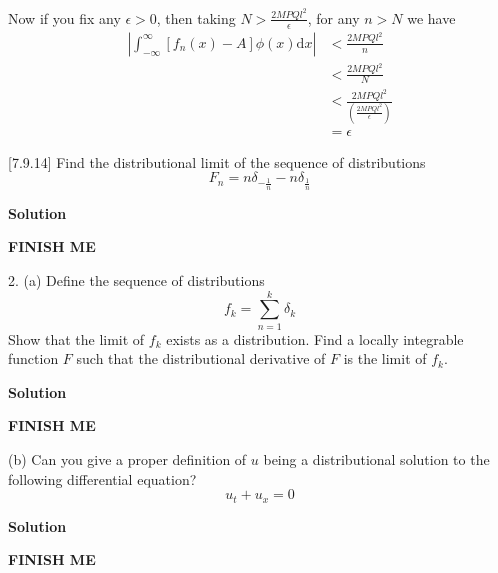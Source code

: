 \documentclass{article}
\begin{document}
%
Now if you fix any $\epsilon > 0$, then taking
$N > \frac{2 M P Q l^2}{\epsilon}$, for any $n > N$ we have
%
\begin{align*}
    \left| \int_{-\infty}^{\infty} \left[ f_n(x) - A \right] \phi(x) \mathrm{d} x \right|
        &< \frac{2 M P Q l^2}{n} \\
        &< \frac{2 M P Q l^2}{N} \\
        &< \frac{2 M P Q l^2}{\left(\frac{2 M P Q l^2}{\epsilon}\right)} \\
        &= \epsilon
\end{align*}

\vspace{5mm}

[7.9.14] Find the distributional limit of the sequence of distributions
%
\begin{equation*}
    F_n = n \delta_{- \frac{1}{n}} - n \delta_{\frac{1}{n}}
\end{equation*}

\textbf{Solution}

\textbf{FINISH ME}

\newpage

2. (a) Define the sequence of distributions
%
\begin{equation*}
    f_k = \sum_{n = 1}^k \delta_k
\end{equation*}
%
Show that the limit of $f_k$ exists as a distribution. Find a locally
integrable function $F$ such that the distributional derivative of $F$
is the limit of $f_k$.

\textbf{Solution}

\textbf{FINISH ME}

\vspace{5mm}

(b) Can you give a proper definition of $u$ being a distributional
solution to the following differential equation?
%
\begin{equation*}
    u_t + u_x = 0
\end{equation*}

\textbf{Solution}

\textbf{FINISH ME}
\end{document}
